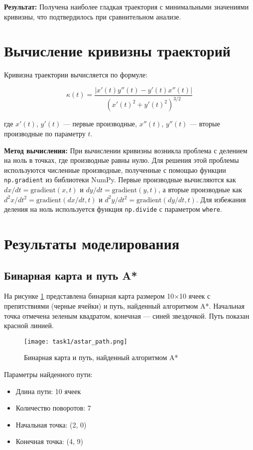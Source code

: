 \textbf{Результат:} Получена наиболее гладкая траектория с минимальными значениями кривизны, что подтвердилось при сравнительном анализе.

\section{Вычисление кривизны траекторий}

Кривизна траектории вычисляется по формуле:

$$\kappa(t) = \frac{|x'(t)y''(t) - y'(t)x''(t)|}{(x'(t)^2 + y'(t)^2)^{3/2}}$$

где $x'(t)$, $y'(t)$ --- первые производные, $x''(t)$, $y''(t)$ --- вторые производные по параметру $t$.

\textbf{Метод вычисления:} При вычислении кривизны возникла проблема с делением на ноль в точках, где производные равны нулю. Для решения этой проблемы используются численные производные, полученные с помощью функции \texttt{np.gradient} из библиотеки NumPy. Первые производные вычисляются как $dx/dt = \text{gradient}(x, t)$ и $dy/dt = \text{gradient}(y, t)$, а вторые производные как $d^2x/dt^2 = \text{gradient}(dx/dt, t)$ и $d^2y/dt^2 = \text{gradient}(dy/dt, t)$. Для избежания деления на ноль используется функция \texttt{np.divide} с параметром \texttt{where}.

\section{Результаты моделирования}

\subsection{Бинарная карта и путь A*}

На рисунке \ref{fig:astar_path} представлена бинарная карта размером 10×10 ячеек с препятствиями (черные ячейки) и путь, найденный алгоритмом A*. Начальная точка отмечена зеленым квадратом, конечная --- синей звездочкой. Путь показан красной линией.

\begin{figure}[H]
\centering
\texttt{[image: task1/astar\_path.png]}
\caption{Бинарная карта и путь, найденный алгоритмом A*}
\label{fig:astar_path}
\end{figure}

Параметры найденного пути:
\begin{itemize}
\item Длина пути: 10 ячеек
\item Количество поворотов: 7
\item Начальная точка: (2, 0)
\item Конечная точка: (4, 9)
\end{itemize}

